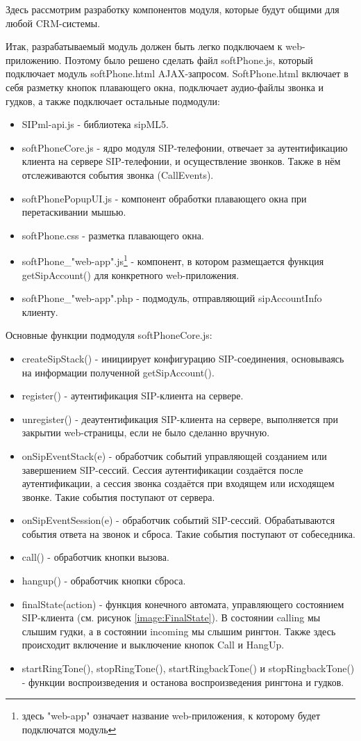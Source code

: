 Здесь рассмотрим разработку компонентов модуля, которые будут общими для любой CRM-системы.

Итак, разрабатываемый модуль должен быть легко подключаем к web-приложению. Поэтому было решено сделать файл softPhone.js, который подключает модуль softPhone.html AJAX-запросом. SoftPhone.html включает в себя разметку кнопок плавающего окна, подключает аудио-файлы звонка и гудков, а также подключает остальные подмодули:
\begin{itemize}
\item SIPml-api.js - библиотека sipML5.
\item softPhoneCore.js - ядро модуля SIP-телефонии, отвечает за аутентификацию клиента на сервере SIP-телефонии, и осуществление звонков. Также в нём отслеживаются события звонка (CallEvents).
\item softPhonePopupUI.js - компонент обработки плавающего окна при перетаскивании мышью.
\item softPhone.css - разметка плавающего окна.
\item softPhone\_"web-app".js\footnote{здесь "web-app" означает название web-приложения, к которому будет подключатся модуль} - компонент, в котором размещается функция getSipAccount() для конкретного web-приложения.
\item softPhone\_"web-app".php - подмодуль, отправляющий sipAccountInfo клиенту.
\end{itemize}

Основные функции подмодуля softPhoneCore.js:
\begin{itemize}
\item createSipStack() - инициирует конфигурацию SIP-соединения, основываясь на информации полученной getSipAccount().
\item register() - аутентификация SIP-клиента на сервере.
\item unregister() - деаутентификация SIP-клиента на сервере, выполняется при закрытии web-страницы, если не было сделанно вручную.
\item onSipEventStack(e) - обработчик событий управляющей созданием или завершением SIP-сессий. Сессия аутентификации создаётся после аутентификации, а сессия звонка создаётся при входящем или исходящем звонке. Такие события поступают от сервера.
\item onSipEventSession(e) - обработчик событий SIP-сессий. Обрабатываются события ответа на звонок и сброса. Такие события поступают от собеседника.
\item call() - обработчик кнопки вызова.
\item hangup() - обработчик кнопки сброса.
\item finalState(action) - функция конечного автомата, управляющего состоянием SIP-клиента (см. рисунок \ref{image:FinalState}). В состоянии calling мы слышим гудки, а в состоянии incoming мы слышим рингтон. Также здесь происходит включение и выключение кнопок Call и HangUp.
\item startRingTone(), stopRingTone(), startRingbackTone() и stopRingbackTone() - функции воспроизведения и останова воспроизведения рингтона и гудков.
\end{itemize}

